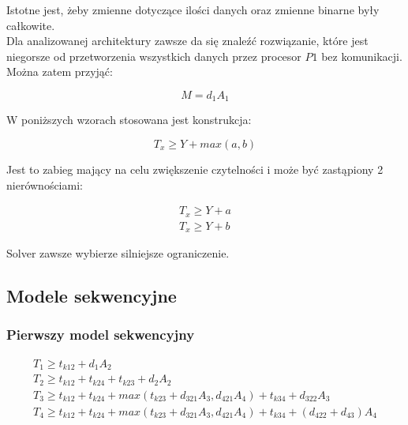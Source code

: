 Istotne jest, żeby zmienne dotyczące ilości danych oraz zmienne binarne były całkowite. \\

Dla analizowanej architektury zawsze da się znaleźć rozwiązanie, które jest niegorsze od
przetworzenia wszystkich danych przez procesor $P1$ bez komunikacji. Można zatem przyjąć:

\begin{equation} \label{eq:M}
M = d_{1}A_{1}
\end{equation}

W poniższych wzorach stosowana jest konstrukcja:

\begin{equation} \label{eq:max1}
T_{x} \geq Y + max(a, b)
\end{equation}

Jest to zabieg mający na celu zwiększenie czytelności i może być zastąpiony 2 nierównościami:

\begin{equation} \label{eq:max2}
\begin{array}{l}
T_{x} \geq Y + a \\
T_{x} \geq Y + b
\end{array}
\end{equation}

Solver zawsze wybierze silniejsze ograniczenie.

\subsection{Modele sekwencyjne}

\subsubsection{Pierwszy model sekwencyjny}

\begin{equation} \label{eq:sek1}
\begin{array}{l}
T_{1} \geq t_{k12} + d_{1}A_{2} \\
T_{2} \geq t_{k12} + t_{k24} + t_{k23} + d_{2}A_{2} \\
T_{3} \geq t_{k12} + t_{k24} + max(t_{k23} + d_{321}A_{3}, d_{421}A_{4}) + t_{k34} + d_{322}A_{3} \\
T_{4} \geq t_{k12} + t_{k24} + max(t_{k23} + d_{321}A_{3}, d_{421}A_{4}) + t_{k34} + (d_{422} + d_{43})A_{4}
\end{array} 
\end{equation}

